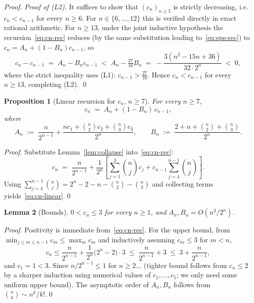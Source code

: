 \documentclass{article}
\newtheorem{proposition}{Proposition}
\newtheorem{lemma}[proposition]{Lemma}
\theoremstyle{remark}
\begin{document}
\begin{proof}
\medskip
\emph{Proof of (L2).} It suffices to show that
$(c_{n})_{n\ge 5}$ is strictly decreasing, i.e.\ $c_{n}<c_{n-1}$ for
every $n\ge 6$. For $n\in\{6,\dots,12\}$ this is verified directly
in exact rational arithmetic. For $n\ge 13$, under the joint inductive
hypothesis the recursion~\eqref{eq:cn-rec} reduces (by the same
substitution leading to~\eqref{eq:eps-rec}) to
$c_{n}=A_{n}+(1-B_{n})c_{n-1}$, so
\[
  c_{n}-c_{n-1}\;=\;A_{n}-B_{n}c_{n-1}\;<\;A_{n}-\tfrac{27}{16}B_{n}\;=\;-\frac{3(n^{2}-15n+36)}{32\cdot 2^{n}}\;<\;0,
\]
where the strict inequality uses (L1): $c_{n-1}>\tfrac{27}{16}$. Hence
$c_{n}<c_{n-1}$ for every $n\ge 13$, completing (L2). \qed
\end{proof}

\begin{proposition}[Linear recursion for $c_{n}$, $n\ge 7$]\label{prop:linear-rec}
For every $n\ge 7$,
\begin{equation}\label{eq:cn-linear}
  c_{n}\;=\;A_{n}+(1-B_{n})\,c_{n-1},
\end{equation}
where
\begin{equation}\label{eq:AnBn-def}
  A_{n}\;:=\;\frac{n}{2^{n-1}}+\frac{nc_{1}+\binom{n}{2}c_{2}+\binom{n}{3}c_{3}}{2^{n}},
  \qquad
  B_{n}\;:=\;\frac{2+n+\binom{n}{2}+\binom{n}{3}}{2^{n}}.
\end{equation}
\end{proposition}

\begin{proof}
Substitute Lemma~\ref{lem:collapse} into~\eqref{eq:cn-rec}:
\[
  c_{n}\;=\;\frac{n}{2^{n-1}}+\frac{1}{2^{n}}\left[\sum_{j=1}^{3}\binom{n}{j}c_{j}
       +c_{n-1}\sum_{j=4}^{n-1}\binom{n}{j}\right].
\]
Using $\sum_{j=4}^{n-1}\binom{n}{j}=2^{n}-2-n-\binom{n}{2}-\binom{n}{3}$
and collecting terms yields~\eqref{eq:cn-linear}.\qed
\end{proof}

\begin{lemma}[Bounds]\label{lem:bounds}
$0<c_{n}\le 3$ for every $n\ge 1$, and $A_{n},B_{n}=O(n^{3}/2^{n})$.
\end{lemma}

\begin{proof}
Positivity is immediate from~\eqref{eq:cn-rec}. For the upper bound,
from $\min_{j\le m\le n-1}c_{m}\le\max_{m}c_{m}$ and inductively
assuming $c_{m}\le 3$ for $m<n$,
\[
  c_{n}\le\frac{n}{2^{n-1}}+\frac{1}{2^{n}}\bigl(2^{n}-2\bigr)\cdot 3
  \;\le\;\frac{n}{2^{n-1}}+3\;\le\;3+\frac{n}{2^{n-1}},
\]
and $c_{1}=1<3$. Since $n/2^{n-1}\le 1$ for $n\ge 2$... (tighter bound
follows from $c_{n}\le 2$ by a sharper induction using numerical values
of $c_{1},\dots,c_{5}$; we only need some uniform upper bound). The
asymptotic order of $A_{n},B_{n}$ follows from $\binom{n}{k}\sim n^{k}/k!$.\qed
\end{proof}
\end{document}
